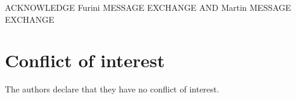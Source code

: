 \documentclass[smallextended]{svjour3}       %
\begin{document}
\begin{comment}
\begin{align}
\mbox{max.} & \sum_{j \in \bar{J}} p_j y_j \label{eq:objfun}\\
\mbox{s.t.} & \specialcell{\sum_{o \in O}\sum_{q \in Q_{jo}} x^o_{qj} + y_j \leq \sum_{k \in J}\sum_{o \in O}\sum_{q \in Q_{ko}} a^o_{qkj} x^o_{qk} \hspace*{0.15\textwidth} \forall j \in \bar{J}, j \neq 0,}\label{eq:}\\
            & \specialcell{\sum_{o \in O}\sum_{q \in Q_{jo}} x^o_{qj} \leq \sum_{k \in J}\sum_{o \in O}\sum_{q \in Q_{ko}} a^o_{qkj} x^o_{qk} \hspace*{\fill} \forall j \in J\setminus\bar{J},}\label{eq:}\\
	    & \specialcell{\sum_{o \in O}\sum_{q \in Q_{0o}} x^o_{q0} + y_0 \leq 1 \hspace*{\fill} ,}\label{eq:}\\
            & \specialcell{y_j \leq u_j \hspace*{\fill} \forall j \in \bar{J},}\label{eq:}\\
	    & \specialcell{x^o_{qj} \in \mathbb{N}^0 \hspace*{\fill} \forall j \in J, o \in O, q \in Q_{jo},}\label{eq:}\\
            & \specialcell{y_j \in \mathbb{N}^0 \hspace*{\fill} \forall j \in \bar{J}.}\label{eq:}
\end{align}
\end{comment}

\begin{acknowledgements}
ACKNOWLEDGE Furini MESSAGE EXCHANGE AND Martin MESSAGE EXCHANGE
\end{acknowledgements}

%
\section*{Conflict of interest}
The authors declare that they have no conflict of interest.

\end{document}
